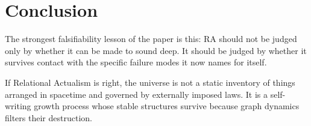 \documentclass[11pt]{article}
\begin{document}
\section{Conclusion}
The strongest falsifiability lesson of the paper is this: RA should not be judged only by whether it can be made to sound deep. It should be judged by whether it survives contact with the specific failure modes it now names for itself.

If Relational Actualism is right, the universe is not a static inventory of things arranged in spacetime and governed by externally imposed laws. It is a self-writing growth process whose stable structures survive because graph dynamics filters their destruction.



\end{document}
